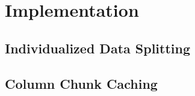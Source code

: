 \section{Implementation}
\label{sec:impl}


\subsection{Individualized Data Splitting}
\label{subsec:data-splitting}

\subsection{Column Chunk Caching}
\label{subsec:chunk-caching}

